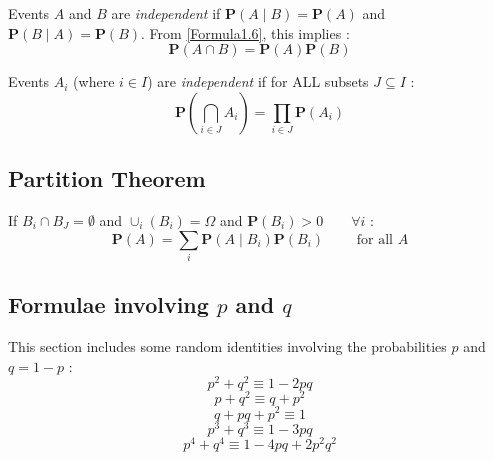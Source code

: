 Events $A$ and $B$ are \emph{independent} if ${\mathbf{P} (A \mid B) = \mathbf{P} (A)}$ and  ${\mathbf{P} (B \mid A) = \mathbf{P} (B)}$.
From \eqref{Formula1.6}, this implies : 
\begin{equation} 
\mathbf{P}(A \cap B) =  \mathbf{P} (A) \mathbf{P} (B)
   \tag{F1.7} \label{Formula1.7}
\end{equation}

Events ${A_i}$ (where $i \in I$) are \emph{independent} if for ALL subsets $J \subseteq I$ :  
\begin{equation} 
\mathbf{P} (\bigcap_{i \in J} A_i) = \prod_{i \in J}  \mathbf{P}(A_i)
   \tag{F1.8} \label{Formula1.8}
\end{equation}

\subsection{Partition Theorem}
If $B_i \cap B_J = \emptyset$ and $\cup_i (B_i) = \Omega$ and $\mathbf{P}(B_i) > 0 \qquad \forall i$ :
\begin{equation} 
\mathbf{P}(A) = \sum_i \mathbf{P}(A \mid B_i)\mathbf{P}(B_i) \qquad \text{ for all } A
   \tag{F1.9} \label{Formula1.9}
\end{equation}

\subsection{Formulae involving $p$ and $q$}
This section includes some random identities involving the probabilities $p$ and $q = 1-p$ :
\begin{equation}
p^2 + q^2 \equiv 1 - 2pq \tag{PQ1} \label{PQ1}
\end{equation}
\begin{equation}
p + q^2 \equiv q + p^2 \tag{PQ2} \label{PQ2}
\end{equation}
\begin{equation}
q + pq + p^2  \equiv 1 \tag{PQ3} \label{PQ3}
\end{equation}
\begin{equation}
p^3 + q^3  \equiv 1-3pq \tag{PQ4} \label{PQ4}
\end{equation}
\begin{equation}
p^4 + q^4  \equiv 1-4pq + 2p^2q^2 \tag{PQ5} \label{PQ5}
\end{equation}
 